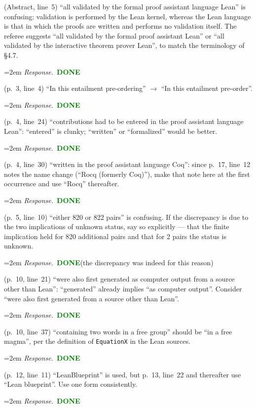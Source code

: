 \documentclass[11pt]{amsart}
\newcommand{\done}{\textcolor{green}{\textbf{DONE}}}
\newcommand{\response}[1]{%
  \par\smallskip
  \noindent\hangindent=2em\hangafter=1
  \textit{Response.}\ #1
  \par\smallskip}
\begin{document}
\begin{requests}[label=\textbf{R2.T\arabic*}]

\item (Abstract, line~5) ``all validated by the formal proof assistant language Lean''
is confusing: validation is performed by the Lean kernel, whereas the Lean language is
that in which the proofs are written and performs no validation itself. The referee
suggests ``all validated by the formal proof assistant Lean'' or ``all validated by the
interactive theorem prover Lean'', to match the terminology of \S4.7.
\response{\done}

\item (p.~3, line~4) ``In this entailment pre-ordering'' \(\to\) ``In this entailment
pre-order''.
\response{\done}

\item (p.~4, line~24) ``contributions had to be entered in the proof assistant language
Lean'': ``entered'' is clunky; ``written'' or ``formalized'' would be better.
\response{\done}

\item (p.~4, line~30) ``written in the proof assistant language Coq'': since p.~17,
line~12 notes the name change (``Rocq (formerly Coq)''), make that note here at the
first occurrence and use ``Rocq'' thereafter.
\response{\done}

\item (p.~5, line~10) ``either 820 or 822 pairs'' is confusing. If the discrepancy is
due to the two implications of unknown status, say so explicitly --- that the finite
implication held for 820 additional pairs and that for 2 pairs the status is unknown.
\response{\done (the discrepancy was indeed for this reason)}

\item (p.~10, line~21) ``were also first generated as computer output from a source
other than Lean'': ``generated'' already implies ``as computer output''. Consider
``were also first generated from a source other than Lean''.
\response{\done}

\item (p.~10, line~37) ``containing two words in a free group'' should be ``in a free
magma'', per the definition of \texttt{EquationX} in the Lean sources.
\response{\done}

\item (p.~12, line~11) ``LeanBlueprint'' is used, but p.~13, line~22 and thereafter use
``Lean blueprint''. Use one form consistently.
\response{\done}


\end{requests}
\end{document}

